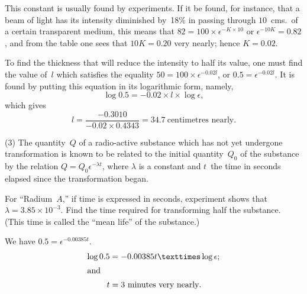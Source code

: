 \documentclass[12pt]{book}[2005/09/16]
\newcommand{\DPPageSep}[2]{\Pagelabel{#2}}
\newcommand{\Pagelabel}[1]
  {\phantomsection\label{#1}}
\newcommand{\DPtypo}[2]{#2}%
\newcommand{\DPchg}[2]{#2}%
\begin{document}
This constant is usually found by experiments. If
it be found, for instance, that a beam of light has
its intensity diminished by~18\% in passing through
$10$~cms.\ of a certain transparent medium, this means
that $82 = 100 × \epsilon^{-K×10}$ or $\epsilon^{-10K} = 0.82$, and from the
table one sees that $10K = 0.20$ very nearly; hence
$K = 0.02$.

To find the thickness that will reduce the intensity
to half its value, one must find the value of~$l$ which
satisfies the equality $50 = 100 × \epsilon^{-0.02l}$, or $0.5 = \epsilon^{-0.02l}$.
\DPPageSep{174.png}{162}%
It is found by putting this equation in its logarithmic
form, namely,
\[
\log 0.5 = -0.02 × l × \log \epsilon,
\]
which gives
\[
l = \frac{\DPchg{\overset{-}{1}.6990}{-0.3010}}{-0.02 × 0.4343}
 = \DPtypo{34.5}{34.7}~\text{centimetres nearly}.
\]

(3) The quantity~$Q$ of a radio-active substance
which has not yet undergone transformation is known
to be related to the initial quantity~$Q_0$ of the substance
by the relation $Q = Q_0 \epsilon^{-\lambda t}$, where $\lambda$ is a constant
and $t$~the time in seconds elapsed since the transformation
began.

For ``Radium~$A$,'' if time is expressed in seconds,
experiment shows that $\lambda = 3.85 × 10^{-3}$. Find the time
required for transforming half the substance. (This
time is called the ``mean life'' of the substance.)

We have $0.5 = \epsilon^{-0.00385t}$.\Pagelabel{erratum0a}%
\begin{align*}
\log 0.5 &= -0.00385t × \log \epsilon; \\
\intertext{and}
t &= 3\text{ minutes very nearly}.
\end{align*}
\end{document}
